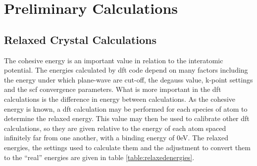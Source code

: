 



















\FloatBarrier
\section{Preliminary Calculations}

\subsection{Relaxed Crystal Calculations}

The cohesive energy is an important value in relation to the interatomic potential.  The energies calculated by \acrshort{dft} code depend on many factors including the energy under which plane-wave are cut-off, the degauss value, k-point settings and the \acrshort{scf} convergence parameters.  What is more important in the \acrshort{dft} calculations is the difference in energy between calculations.  As the cohesive energy is known, a \acrshort{dft} calculation may be performed for each species of atom to determine the relaxed energy.  This value may then be used to calibrate other \acrshort{dft} calculations, so they are given relative to the energy of each atom spaced infinitely far from one another, with a binding energy of 0eV.  The relaxed energies, the settings used to calculate them and the adjustment to convert them to the \enquote{real} energies are given in table \ref{table:relaxedenergies}.

